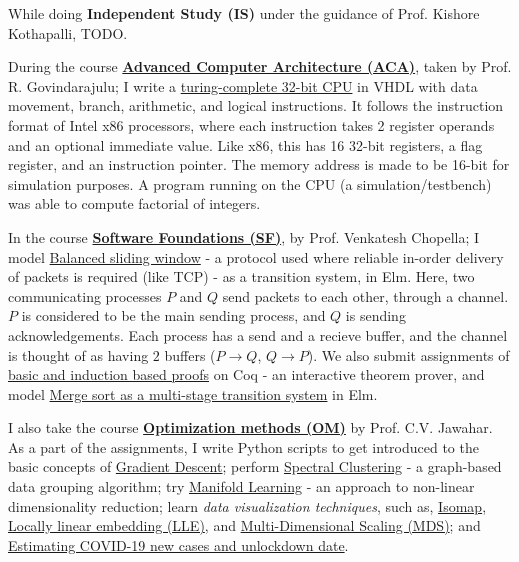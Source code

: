 While doing \textbf{Independent Study (IS)} under the guidance of Prof. Kishore Kothapalli, TODO.

During the course \textbf{\href{https://github.com/iiithf/advanced-computer-architecture}{Advanced Computer Architecture (ACA)}}, taken by Prof. R. Govindarajulu; I write a \href{https://github.com/vhdlf/cpu_basic}{turing-complete 32-bit CPU} in VHDL with data movement, branch, arithmetic, and logical instructions. It follows the instruction format of Intel x86 processors, where each instruction takes 2 register operands and an optional immediate value. Like x86, this has 16 32-bit registers, a flag register, and an instruction pointer. The memory address is made to be 16-bit for simulation purposes. A program running on the CPU (a simulation/testbench) was able to compute factorial of integers.

In the course \textbf{\href{https://github.com/iiithf/software-foundations}{Software Foundations (SF)}}, by Prof. Venkatesh Chopella; I model \href{https://github.com/htmlf/balanced-sliding-window}{Balanced sliding window} - a protocol used where reliable in-order delivery of packets is required (like TCP) - as a transition system, in Elm. Here, two communicating processes $P$ and $Q$ send packets to each other, through a channel. $P$ is considered to be the main sending process, and $Q$ is sending acknowledgements. Each process has a send and a recieve buffer, and the channel is thought of as having $2$ buffers ($P \rightarrow Q$, $Q \rightarrow P$). We also submit assignments of \href{https://github.com/iiithf/software-foundations/blob/main/Assignments/Coq}{basic and induction based proofs} on Coq - an interactive theorem prover, and model \href{https://github.com/htmlf/merge-sort}{Merge sort as a multi-stage transition system} in Elm.

I also take the course \textbf{\href{https://github.com/iiithf/optimization-methods}{Optimization methods (OM)}} by Prof. C.V. Jawahar. As a part of the assignments, I write Python scripts to get introduced to the basic concepts of \href{https://github.com/python3f/gradient-descent}{Gradient Descent}; perform \href{https://github.com/python3f/spectral-clustering}{Spectral Clustering} - a graph-based data grouping algorithm; try \href{https://github.com/python3f/manifold-learning}{Manifold Learning} - an approach to non-linear dimensionality reduction; learn \textit{data visualization techniques}, such as, \href{https://github.com/python3f/isomap}{Isomap}, \href{https://github.com/python3f/locally-linear-embedding}{Locally linear embedding (LLE)}, and \href{https://github.com/python3f/multidimensional-scaling}{Multi-Dimensional Scaling (MDS)}; and \href{https://github.com/python3f/covid19-estimate}{Estimating COVID-19 new cases and unlockdown date}.

